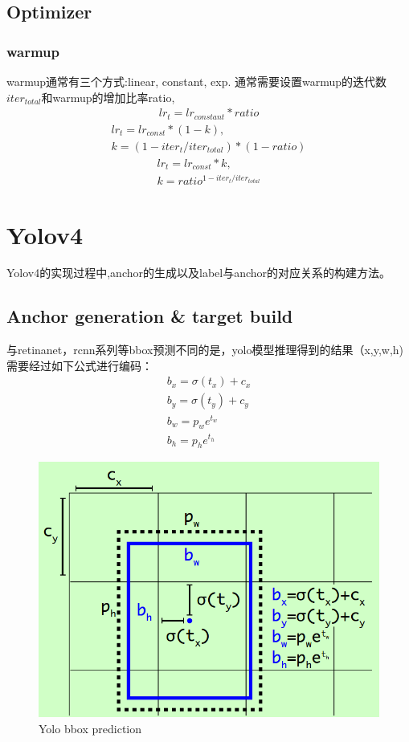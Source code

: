 \documentclass{article}
\begin{document}
\subsection{Optimizer}
\subsubsection{warmup}
warmup通常有三个方式:linear, constant, exp. 通常需要设置warmup的迭代数$iter_{total}$和warmup的增加比率ratio,
\begin{align}
lr_t = lr_{constant}*ratio
\end{align}
\begin{equation}
\begin{aligned}
lr_t = lr_{const}*(1-k), \\
k= (1-iter_t /iter_{total}) * (1-ratio)
\end{aligned}
\end{equation}
\begin{align}
lr_t = lr_{const}*k, \\
k=ratio^{1-iter_t/iter_{total}}
\end{align}

\section{Yolov4}
Yolov4的实现过程中,anchor的生成以及label与anchor的对应关系的构建方法。
\subsection{Anchor generation \& target build}
与retinanet，rcnn系列等bbox预测不同的是，yolo模型推理得到的结果（x,y,w,h)需要经过如下公式进行编码：
\begin{equation}
\begin{aligned}
b_x = \sigma(t_x)+c_x \\
b_y = \sigma(t_y)+c_y \\
b_w = p_we^{t_w} \\
b_h = p_he^{t_h}
\end{aligned}
\end{equation}
\begin{figure}[htp!]
\centering
\includegraphics[scale=0.3]{images/yolo_bbox.png}
\caption{Yolo bbox prediction}
\end{figure}
\end{document}
